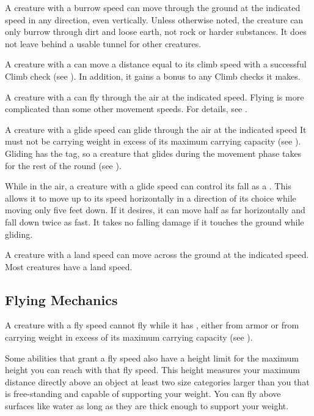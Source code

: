         A creature with a burrow speed can move through the ground at the indicated speed in any direction, even vertically. Unless otherwise noted, the creature can only burrow through dirt and loose earth, not rock or harder substances. It does not leave behind a usable tunnel for other creatures.

        A creature with a  can move a distance equal to its climb speed with a successful Climb check (see ).
        In addition, it gains a  bonus to any Climb checks it makes.

        \label{Flying}
        A creature with a  can fly through the air at the indicated speed.
        Flying is more complicated than some other movement speeds.
        For details, see .

        \label{Gliding}
        A creature with a glide speed can glide through the air at the indicated speed
        It must not be carrying weight in excess of its maximum carrying capacity (see ).
        Gliding has the  tag, so a creature that glides during the movement phase takes  for the rest of the round (see ).

        While in the air, a creature with a glide speed can control its fall as a . This allows it to move up to its speed horizontally in a direction of its choice while moving only five feet down. If it desires, it can move half as far horizontally and fall down twice as fast. It takes no falling damage if it touches the ground while gliding.

        A creature with a land speed can move across the ground at the indicated speed.
        Most creatures have a land speed.

    \subsection{Flying Mechanics}
        A creature with a fly speed cannot fly while it has , either from armor or from carrying weight in excess of its maximum carrying capacity (see ).

         Some abilities that grant a fly speed also have a height limit for the maximum height you can reach with that fly speed.
        This height measures your maximum distance directly above an object at least two size categories larger than you that is free-standing and capable of supporting your weight.
        You can fly above surfaces like water as long as they are thick enough to support your weight.

